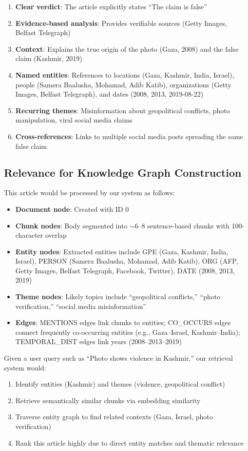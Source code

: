 \documentclass[10pt]{article}
\begin{document}
\begin{enumerate}[itemsep=3pt]
    \item \textbf{Clear verdict}: The article explicitly states ``The claim is false''
    \item \textbf{Evidence-based analysis}: Provides verifiable sources (Getty Images, Belfast Telegraph)
    \item \textbf{Context}: Explains the true origin of the photo (Gaza, 2008) and the false claim (Kashmir, 2019)
    \item \textbf{Named entities}: References to locations (Gaza, Kashmir, India, Israel), people (Samera Baalusha, Mohamad, Adib Katib), organizations (Getty Images, Belfast Telegraph), and dates (2008, 2013, 2019-08-22)
    \item \textbf{Recurring themes}: Misinformation about geopolitical conflicts, photo manipulation, viral social media claims
    \item \textbf{Cross-references}: Links to multiple social media posts spreading the same false claim
\end{enumerate}

\subsection{Relevance for Knowledge Graph Construction}

This article would be processed by our system as follows:

\begin{itemize}[itemsep=3pt]
    \item \textbf{Document node}: Created with ID 0
    \item \textbf{Chunk nodes}: Body segmented into $\sim$6--8 sentence-based chunks with 100-character overlap
    \item \textbf{Entity nodes}: Extracted entities include GPE (Gaza, Kashmir, India, Israel), PERSON (Samera Baalusha, Mohamad, Adib Katib), ORG (AFP, Getty Images, Belfast Telegraph, Facebook, Twitter), DATE (2008, 2013, 2019)
    \item \textbf{Theme nodes}: Likely topics include ``geopolitical conflicts,'' ``photo verification,'' ``social media misinformation''
    \item \textbf{Edges}: MENTIONS edges link chunks to entities; CO\_OCCURS edges connect frequently co-occurring entities (e.g., Gaza--Israel, Kashmir--India); TEMPORAL\_DIST edges link years (2008--2013--2019)
\end{itemize}

Given a user query such as ``Photo shows violence in Kashmir,'' our retrieval system would:
\begin{enumerate}[itemsep=3pt]
    \item Identify entities (Kashmir) and themes (violence, geopolitical conflict)
    \item Retrieve semantically similar chunks via embedding similarity
    \item Traverse entity graph to find related contexts (Gaza, Israel, photo verification)
    \item Rank this article highly due to direct entity matches and thematic relevance
\end{enumerate}
\end{document}
